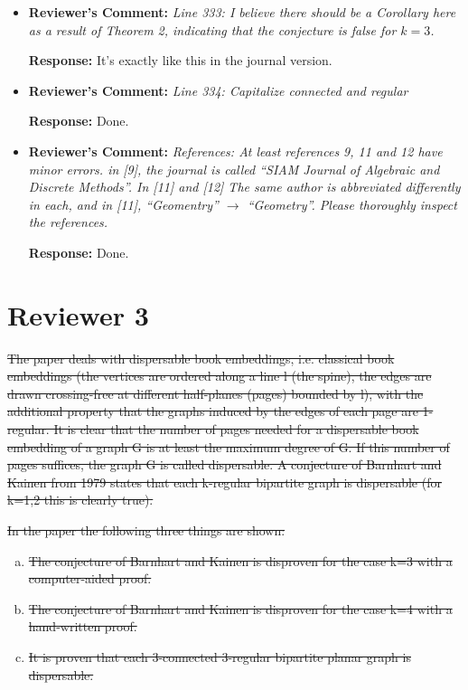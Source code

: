 \documentclass{article}
\newcommand{\rcomment}[1]{\vspace{0.3cm} \item \textbf{Reviewer's Comment:} {\em #1}}
\newcommand{\response}{\vspace{0.2cm} \textbf{Response: }}
\begin{document}
\begin{itemize}
{\begin{itemize}
\rcomment{Line 333: I believe there should be a Corollary here as a result of Theorem 2, indicating that the conjecture is false for $k=3$.}

\response{It's exactly like this in the journal version.}

\rcomment{Line 334: Capitalize connected and regular}

\response{Done.}

\rcomment{References: At least references 9, 11 and 12 have minor errors. in [9], the journal is called ``SIAM Journal of Algebraic and Discrete Methods''. In [11] and [12] The same author is abbreviated differently in each, and in [11], ``Geomentry'' $\rightarrow$ ``Geometry''. Please thoroughly inspect the references.}

\response{Done.}
\end{itemize}

\newpage
\section*{Reviewer 3}

\st{The paper deals with dispersable book embeddings, i.e. classical book embeddings (the vertices are ordered along a line l (the spine), the edges are drawn crossing-free at different half-planes (pages) bounded by l), with the additional property that the graphs induced by the edges of each page are 1-regular. It is clear that the number of pages needed for a dispersable book embedding of a graph G is at least the maximum degree of G. If this number of pages suffices, the graph G is called dispersable. A conjecture of Barnhart and Kainen from 1979 states that each k-regular bipartite graph is dispersable
(for k=1,2 this is clearly true).}

\st{In the paper the following three things are shown:}
\begin{enumerate}[(a)]
\item \st{The conjecture of Barnhart and Kainen is disproven for the case k=3 with a computer-aided proof.}
\item \st{The conjecture of Barnhart and Kainen is disproven for the case k=4 with a hand-written proof.}
\item \st{It is proven that each 3-connected 3-regular bipartite planar graph is dispersable.}
\end{enumerate}

}
\end{itemize}
\end{document}
